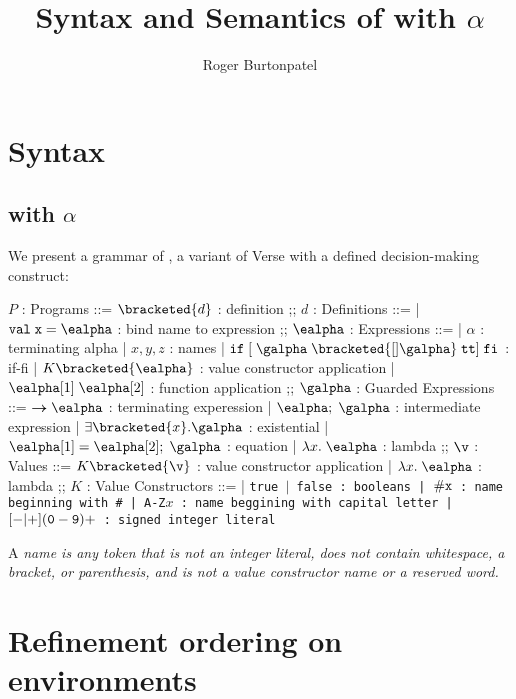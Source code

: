 \documentclass[]{article}
\title{Syntax and Semantics of {\VMinus} with $\alpha$}
\author{Roger Burtonpatel}
\begin{document}
\maketitle

\section{Syntax}

\subsection{{\VMinus} with $\alpha$}

We present a grammar of {\VMinus}, a variant of Verse with a defined
decision-making construct: 

\bigskip


\begin{center}
    \begin{bnf}
    $P$ : \textsf{Programs} ::=
    $\bracketed{d}$ : definition
    ;;
    $d$ : \textsf{Definitions} ::=
    | $\tt{val}\; x\; \tt{=}\; \ealpha$ : bind name to expression
    ;;
    $\ealpha$ : \textsf{Expressions} ::=
    | $\alpha$ : terminating alpha
    | $x, y, z$ : names
    | $\tt{if}\; \tt{[}\; \galpha\; \bracketed{[] \galpha}\; tt{]}\; \tt{fi}$ : if-fi 
    | $K \bracketed{\ealpha}$ : value constructor application 
    | $\ealpha[1]\; \ealpha[2]$ : function application 
    ;;
    $\galpha$ : \textsf{Guarded Expressions} ::=  
    $\boldsymbol{\rightarrow}\ealpha$ : terminating experession
    | $\ealpha;\; \galpha$ : intermediate expression 
    | $\exists \bracketed{x} \tt{.} \galpha$ : existential 
    | $\ealpha[1] = \ealpha[2];\; \galpha$ : equation 
    | $\lambda x.\; \ealpha$ : lambda 
    ;;
    $\v$ : Values ::= $K\bracketed{\v}$ : value constructor application 
    | $\lambda x.\; \ealpha$ : lambda 
    ;;
    $K$ : \textsf{Value Constructors} ::=
    | \tt{true} $\vert$ \tt{false} : booleans
    | $\tt{\#}x$ : name beginning with \tt{\#}
    | \tt{A-Z}$x$ : name beggining with capital letter
    | $[\tt{-}\vert\tt{+}](\tt{0}-\tt{9})+$ : signed integer literal 
    \end{bnf}
\end{center}

A \it{name} is any token that is not an integer literal, 
does not contain whitespace, a bracket, or parenthesis, 
and is not a value constructor name or a reserved word.
        
\section{Refinement ordering on environments}
\end{document}
